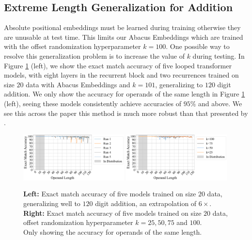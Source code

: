 \documentclass{article}
\begin{document}
\subsection{Extreme Length Generalization for Addition}
\label{app-subsubsec:extreme_gen}
Absolute positional embeddings must be learned during training otherwise they are unusable at test time.
This limits our Abacus Embeddings which are trained with the offset randomization hyperparameter \(k=100\).
One possible way to resolve this generalization problem is to increase the value of \(k\) during testing.
In Figure \ref{fig:extreme-gen} (left), we show the exact match accuracy of five looped transformer models, with eight layers in the recurrent block and two recurrences trained on size \(20\) data with Abacus Embeddings and \(k=101\), generalizing to \(120\) digit addition.
We only show the accuracy for operands of the same length in Figure \ref{fig:extreme-gen} (left), seeing these models consistently achieve accuracies of \(95\%\) and above.
We see this across the paper this method is much more robust than that presented by \citet{zhou2024transformers}.

\begin{figure}[ht!]
    \centering
    \includegraphics[width=0.49\textwidth]{Figures/plot_17_101.pdf}
    \includegraphics[width=0.49\textwidth]{Figures/plot_20.pdf}
    \caption{
    \textbf{Left:} Exact match accuracy of five models trained on size \(20\) data, generalizing well to \(120\) digit addition, an extrapolation of \(6\times\).
    \textbf{Right:} Exact match accuracy of five models trained on size \(20\) data, offset randomization hyperparameter \(k=25,50,75\) and \(100\).\\
    Only showing the accuracy for operands of the same length.
    }
    \label{fig:extreme-gen}
\end{figure}
\end{document}
